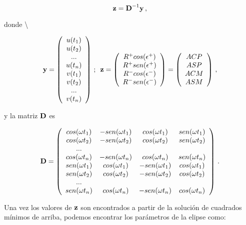\documentclass[
]{agujournal2019}
\begin{document}
\[{\textbf z}={\textbf D}^{-1}{\textbf y}\,,\]

donde \textbackslash{}

\[{\textbf y}=\left( \begin{array}{c}
u(t_1) \\
u(t_2) \\
... \\
u(t_n) \\
v(t_1) \\
v(t_2) \\
... \\
v(t_n) \\
\end{array} \right)\,;\,\,\,
{\textbf z}=\left( \begin{array}{c}
R^+cos(\epsilon^+) \\
R^+sen(\epsilon^+)\\
R^-cos(\epsilon^-) \\
R^-sen(\epsilon^-)\\
\end{array} \right)=
\left( \begin{array}{c}
ACP \\
ASP\\
ACM \\
ASM\\
\end{array} \right)\,,\]

y la matriz \({\textbf D}\) es

\[{\textbf D}=\left( \begin{array}{cccc}
cos(\omega t_1) & -sen(\omega t_1) & cos(\omega t_1) & sen(\omega t_1) \\
cos(\omega t_2) & -sen(\omega t_2) & cos(\omega t_2) & sen(\omega t_2) \\
... \\
cos(\omega t_n) & -sen(\omega t_n) & cos(\omega t_n) & sen(\omega t_n) \\
sen(\omega t_1) & cos(\omega t_1) & -sen(\omega t_1) & cos(\omega t_1) \\
sen(\omega t_2) & cos(\omega t_2) & -sen(\omega t_2) & cos(\omega t_2) \\
... \\
sen(\omega t_n) & cos(\omega t_n) & -sen(\omega t_n) & cos(\omega t_n) \\
\end{array} \right)\,.\]

Una vez los valores de \({\textbf z}\) son encontrados a partir de la
solución de cuadrados mínimos de arriba, podemos encontrar los
parámetros de la elipse como:
\end{document}

